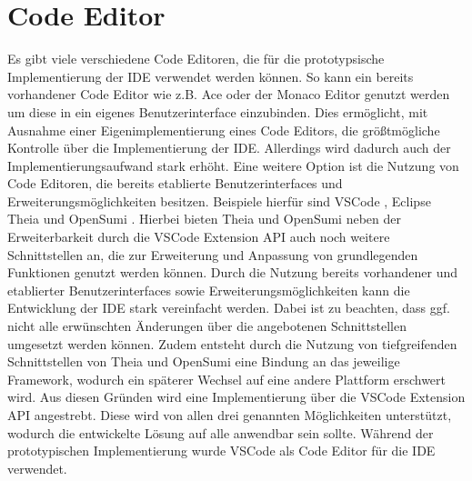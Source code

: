 \section{Code Editor}\label{section:prototypische-implementierung:code-editor}


Es gibt viele verschiedene Code Editoren, die für die prototypsische Implementierung der IDE verwendet werden können. So kann ein bereits vorhandener Code Editor wie z.B. Ace oder der Monaco Editor genutzt werden um diese in ein eigenes Benutzerinterface einzubinden. Dies ermöglicht, mit Ausnahme einer Eigenimplementierung eines Code Editors, die größtmögliche Kontrolle über die Implementierung der IDE. Allerdings wird dadurch auch der Implementierungsaufwand stark erhöht. Eine weitere Option ist die Nutzung von Code Editoren, die bereits etablierte Benutzerinterfaces und Erweiterungsmöglichkeiten besitzen. Beispiele hierfür sind \ac{VSCode} \cite{noauthor_vscode_nodate}, Eclipse Theia \cite{noauthor_theia_nodate} und OpenSumi \cite{noauthor_opensumi_nodate}. Hierbei bieten Theia und OpenSumi neben der Erweiterbarkeit durch die VSCode Extension API \cite{noauthor_vscode-extension-api_nodate} auch noch weitere Schnittstellen an, die zur Erweiterung und Anpassung von grundlegenden Funktionen genutzt werden können. Durch die Nutzung bereits vorhandener und etablierter Benutzerinterfaces sowie Erweiterungsmöglichkeiten kann die Entwicklung der IDE stark vereinfacht werden. Dabei ist zu beachten, dass ggf. nicht alle erwünschten Änderungen über die angebotenen Schnittstellen umgesetzt werden können. Zudem entsteht durch die Nutzung von tiefgreifenden Schnittstellen von Theia und OpenSumi eine Bindung an das jeweilige Framework, wodurch ein späterer Wechsel auf eine andere Plattform erschwert wird. Aus diesen Gründen wird eine Implementierung über die VSCode Extension API angestrebt. Diese wird von allen drei genannten Möglichkeiten unterstützt, wodurch die entwickelte Lösung auf alle anwendbar sein sollte. Während der prototypischen Implementierung wurde \ac{VSCode} als Code Editor für die IDE verwendet.